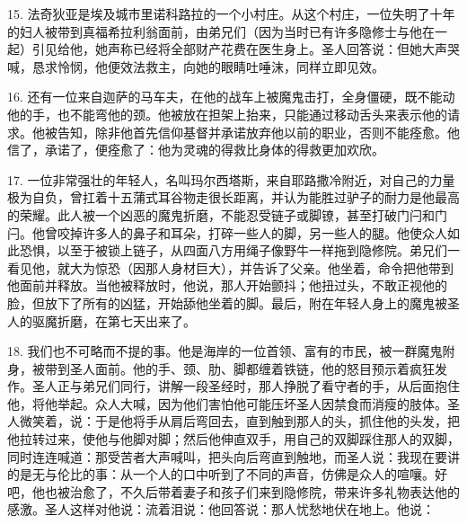 15. 法奇狄亚是埃及城市里诺科路拉的一个小村庄。从这个村庄，一位失明了十年的妇人被带到真福希拉利翁面前，由弟兄们（因为当时已有许多隐修士与他在一起）引见给他，她声称已经将全部财产花费在医生身上。圣人回答说：但她大声哭喊，恳求怜悯，他便效法救主，向她的眼睛吐唾沫，同样立即见效。\par

16. 还有一位来自迦萨的马车夫，在他的战车上被魔鬼击打，全身僵硬，既不能动他的手，也不能弯他的颈。他被放在担架上抬来，只能通过移动舌头来表示他的请求。他被告知，除非他首先信仰基督并承诺放弃他以前的职业，否则不能痊愈。他信了，承诺了，便痊愈了：他为灵魂的得救比身体的得救更加欢欣。\par

17. 一位非常强壮的年轻人，名叫玛尔西塔斯，来自耶路撒冷附近，对自己的力量极为自负，曾扛着十五蒲式耳谷物走很长距离，并认为能胜过驴子的耐力是他最高的荣耀。此人被一个凶恶的魔鬼折磨，不能忍受链子或脚镣，甚至打破门闩和门闩。他曾咬掉许多人的鼻子和耳朵，打碎一些人的脚，另一些人的腿。他使众人如此恐惧，以至于被锁上链子，从四面八方用绳子像野牛一样拖到隐修院。弟兄们一看见他，就大为惊恐（因那人身材巨大），并告诉了父亲。他坐着，命令把他带到他面前并释放。当他被释放时，他说，那人开始颤抖；他扭过头，不敢正视他的脸，但放下了所有的凶猛，开始舔他坐着的脚。最后，附在年轻人身上的魔鬼被圣人的驱魔折磨，在第七天出来了。\par

18. 我们也不可略而不提的事。他是海岸的一位首领、富有的市民，被一群魔鬼附身，被带到圣人面前。他的手、颈、肋、脚都缠着铁链，他的怒目预示着疯狂发作。圣人正与弟兄们同行，讲解一段圣经时，那人挣脱了看守者的手，从后面抱住他，将他举起。众人大喊，因为他们害怕他可能压坏圣人因禁食而消瘦的肢体。圣人微笑着，说：于是他将手从肩后弯回去，直到触到那人的头，抓住他的头发，把他拉转过来，使他与他脚对脚；然后他伸直双手，用自己的双脚踩住那人的双脚，同时连连喊道：那受苦者大声喊叫，把头向后弯直到触地，而圣人说：我现在要讲的是无与伦比的事：从一个人的口中听到了不同的声音，仿佛是众人的喧嚷。好吧，他也被治愈了，不久后带着妻子和孩子们来到隐修院，带来许多礼物表达他的感激。圣人这样对他说：流着泪说：他回答说：那人忧愁地伏在地上。他说：\par

